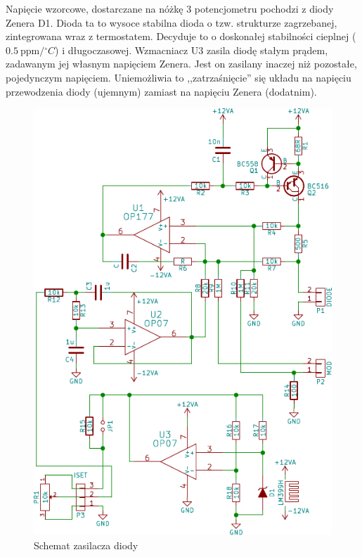 \documentclass[a4paper,10pt]{article}
\begin{document}
Napięcie wzorcowe, dostarczane na nóżkę 3 potencjometru pochodzi z diody Zenera D1. Dioda ta to wysoce stabilna dioda o tzw. strukturze zagrzebanej, zintegrowana wraz z termostatem. Decyduje to o doskonałej stabilności cieplnej ($0.5~\mathrm{ppm}/{}^{\circ}C$) i długoczasowej.  Wzmacniacz U3 zasila diodę stałym prądem, zadawanym jej własnym napięciem Zenera. Jest on zasilany inaczej niż pozostałe, pojedynczym napięciem. Uniemożliwia to ,,zatrzaśnięcie'' się układu na napięciu przewodzenia diody (ujemnym) zamiast na napięciu Zenera (dodatnim). 

\begin{figure}
\begin{center}
 \includegraphics{./obrazki/VcselPSU.pdf}
\end{center}
\caption{Schemat zasilacza diody}
\label{sch-psu}
\end{figure}
\end{document}
